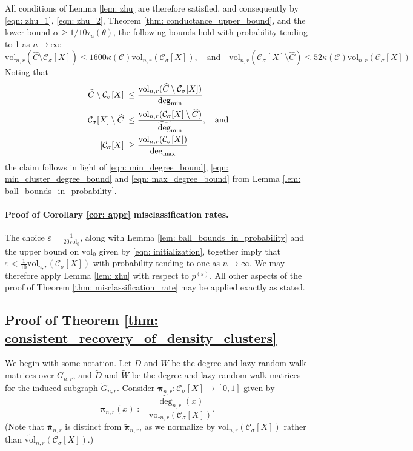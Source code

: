 \documentclass[11pt,twoside]{article}
\DeclarePairedDelimiter\abs{\lvert}{\rvert}
\newcommand{\vol}{\mathrm{vol}}
\newcommand{\1}{\mathbf{1}}
\newcommand{\pbf}{p}        %
\newcommand{\pibf}{\bm{\pi}}
\newcommand{\Xbf}{X}             %
\newcommand{\Wbf}{W}
\newcommand{\Dbf}{D}
\newcommand{\Cset}{\mathcal{C}}
\newcommand{\Csig}{\Cset_{\sigma}}
\newcommand{\degminwt}{\widetilde{\deg}_{\min}}
\newcommand{\degmax}{\deg_{\max}}
\newcommand{\degmin}{\deg_{\min}}
\begin{document}
All conditions of Lemma \ref{lem: zhu} are therefore satisfied, and consequently by \eqref{eqn: zhu_1}, \eqref{eqn: zhu_2}, Theorem \ref{thm: conductance_upper_bound}, and the lower bound $\alpha \geq 1/10\tau_u(\theta)$, the following bounds hold with probability tending to 1 as $n \to \infty$:
\begin{equation*}
\vol_{n,r}(\widehat{C} \setminus \Csig[\Xbf]) \leq 1600 \kappa(\Cset) \vol_{n,r}(\Csig[\Xbf]), \quad \textrm{and} \quad  \vol_{n,r}(\Csig[\Xbf] \setminus \widehat{C}) \leq 52 \kappa(\Cset) \vol_{n,r}(\Csig[\Xbf])
\end{equation*}
Noting that
\begin{align*}
\abs{\widehat{C} \setminus \Csig[\Xbf]} & \leq \frac{\vol_{n,r}(\widehat{C} \setminus \Csig[\Xbf])}{\degmin}   \\
\abs{\Csig[\Xbf] \setminus \widehat{C}} & \leq \frac{\vol_{n,r}(\Csig[\Xbf] \setminus \widehat{C})}{\degminwt}, \quad \textrm{and} \\
\abs{\Csig[\Xbf]} & \geq \frac{\vol_{n,r}(\Csig[\Xbf])}{\degmax}
\end{align*}
the claim follows in light of \eqref{eqn: min_degree_bound}, \eqref{eqn: min_cluster_degree_bound} and \eqref{eqn: max_degree_bound} from Lemma \ref{lem: ball_bounds_in_probability}.

\paragraph{Proof of Corollary \ref{cor: appr} misclassification rates.}

The choice $\varepsilon = \frac{1}{20 \vol_0}$, along with Lemma \ref{lem: ball_bounds_in_probability} and the upper bound on $\vol_0$ given by \eqref{eqn: initialization}, together imply that $\varepsilon < \frac{1}{10}\vol_{n,r}(\Csig[\Xbf])$ with probability tending to one as $n \to \infty$. We may therefore apply Lemma \ref{lem: zhu} with respect to $\pbf^{(\varepsilon)}$. All other aspects of the proof of Theorem \ref{thm: misclassification_rate} may be applied exactly as stated.



\subsection{Proof of Theorem \ref{thm: consistent_recovery_of_density_clusters}}
\label{sec: proof_of_consistent_cluster_recovery}

We begin with some notation. Let $\Dbf$ and $\Wbf$ be the degree and lazy random walk matrices over $G_{n,r}$, and $\widetilde{\Dbf}$ and $\widetilde{\Wbf}$ be the degree and lazy random walk matrices for the induced subgraph $\widetilde{G}_{n,r}$. Consider $\overline{\pibf}_{n,r}: \Csig[\Xbf] \to [0,1]$ given by
\begin{equation*}
\overline{\pibf}_{n,r}(x) := \frac{\widetilde{\deg}_{n,r}(x)}{\vol_{n,r}(\Csig[\Xbf])}.
\end{equation*}
(Note that $\overline{\pibf}_{n,r}$ is distinct from $\widetilde{\pibf}_{n,r}$, as we normalize by $\vol_{n,r}(\Csig[\Xbf])$ rather than $\widetilde{\vol}_{n,r}(\Csig[\Xbf])$.)
\end{document}
